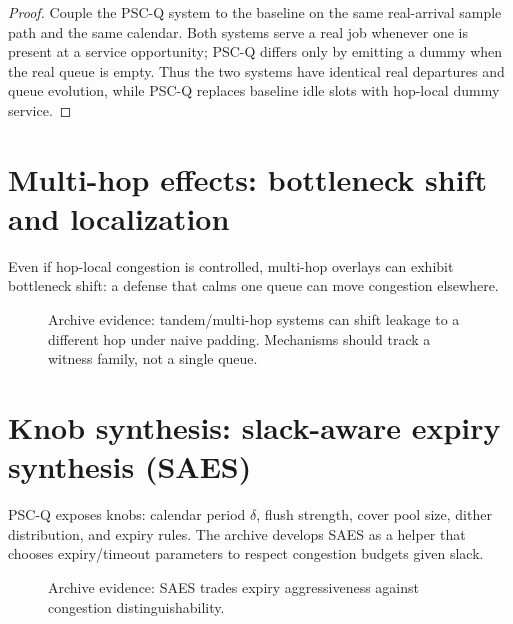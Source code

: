\documentclass[11pt]{article}
\theoremstyle{definition}
\theoremstyle{remark}
\begin{document}
\begin{proof}
Couple the PSC-Q system to the baseline on the same real-arrival sample path and the same calendar.
Both systems serve a real job whenever one is present at a service opportunity; PSC-Q differs only by emitting a dummy when the real queue is empty.
Thus the two systems have identical real departures and queue evolution, while PSC-Q replaces baseline idle slots with hop-local dummy service.
\end{proof}

\section{Multi-hop effects: bottleneck shift and localization}
Even if hop-local congestion is controlled, multi-hop overlays can exhibit bottleneck shift: a defense that calms one queue can move congestion elsewhere.

\begin{figure}[t]
\centering
{}
\caption{Archive evidence: tandem/multi-hop systems can shift leakage to a different hop under naive padding. Mechanisms should track a witness family, not a single queue.}
\label{fig:tandem}
\end{figure}

\section{Knob synthesis: slack-aware expiry synthesis (SAES)}
PSC-Q exposes knobs: calendar period $\delta$, flush strength, cover pool size, dither distribution, and expiry rules.
The archive develops SAES as a helper that chooses expiry/timeout parameters to respect congestion budgets given slack.

\begin{figure}[t]
\centering
{}
\caption{Archive evidence: SAES trades expiry aggressiveness against congestion distinguishability.}
\label{fig:saes}
\end{figure}
\end{document}
